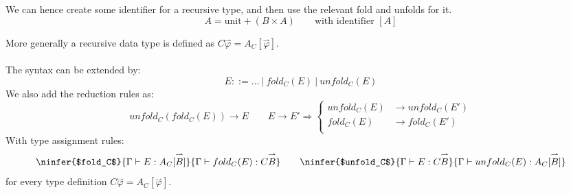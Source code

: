 We can hence create some identifier for a recursive type, and then use the relevant fold and unfolds for it.
\[A = \text{unit} + (B \times A) \qquad \text{with identifier } [A]\]

More generally a recursive data type is defined as $C \overset{\rightharpoonup}{\varphi} = A_C[\overset{\rightharpoonup}{\varphi}]$.
\\
\\ The syntax can be extended by:
\[E ::= \dots \ | \ fold_C(E) \ | \ unfold_C(E)\]
We also add the reduction rules as:
\[unfold_C(fold_C(E)) \to E \qquad E \to E' \Rightarrow \begin{cases}
    unfold_C(E) & \to unfold_C(E') \\
    fold_C(E) & \to fold_C(E') \\
\end{cases}\]
With type assignment rules:
\[\ninfer{$fold_C$}{
    \Gamma \vdash E : A_C[\overset{\rightharpoonup}{B}]
}{
    \Gamma \vdash fold_C(E) : C \overset{\rightharpoonup}{B}
} \qquad \ninfer{$unfold_C$}{
    \Gamma \vdash E : C \overset{\rightharpoonup}{B}
}{
    \Gamma \vdash unfold_C(E) : A_C[\overset{\rightharpoonup}{B}]
}\]
for every type definition $C \overset{\rightharpoonup}{\varphi} = A_C[\overset{\rightharpoonup}{\varphi}]$.

